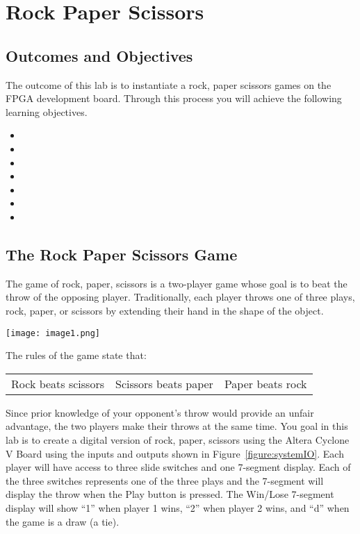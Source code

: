 \chapter{Rock Paper Scissors}
\label{RPS}
\graphicspath{ {./Lab03RockPaperScissor/Fig} }


\section{Outcomes and Objectives}

The outcome of this lab is to instantiate a rock, paper scissors games
on the FPGA development board. 
Through this process you will achieve the following
learning objectives.
\begin{itemize}
	\itemsep=0em
	\item {}
	\item {}
	\item {}
	\item {}
	\item {}
	\item {}
	\item {}
\end{itemize}

\section{The Rock Paper Scissors Game}

The game of rock, paper, scissors is a two-player game whose goal is to
beat the throw of the opposing player. Traditionally, each player throws
one of three plays, rock, paper, or scissors by extending their hand in
the shape of the object.

\texttt{[image:  image1.png]}

The rules of the game state that:

\begin{tabular}{p{4cm}p{4cm}p{4cm}}
Rock beats scissors  & Scissors beats paper & Paper beats rock \\
\end{tabular}

Since prior knowledge of your opponent's throw would provide an unfair
advantage, the two players make their throws at the same time. You goal 
in this lab is to create a digital version of rock, paper,
scissors using the Altera Cyclone V Board using the inputs and outputs
shown in Figure~\ref{figure:systemIO}. Each player will have access to three slide switches
and one 7-segment display. Each of the three switches represents one of
the three plays and the 7-segment will display the throw when the Play
button is pressed. The Win/Lose 7-segment display will show ``1'' when
player 1 wins, ``2'' when player 2 wins, and ``d'' when the game is a
draw (a tie).

